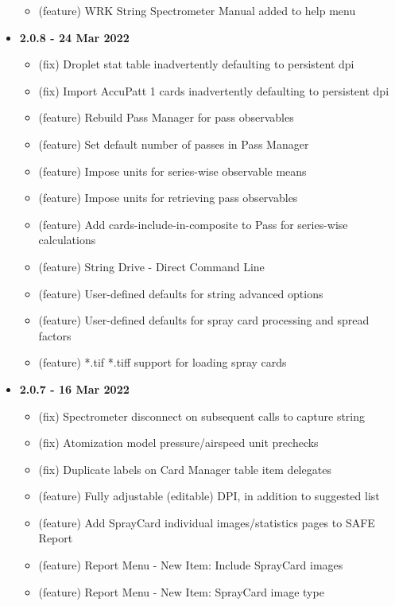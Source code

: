 \documentclass[10pt,letterpaper,titlepage]{article}
\begin{document}
\begin{itemize}
\begin{itemize}
            \item (feature) WRK String Spectrometer Manual added to help menu
        \end{itemize}
        \item \textbf{2.0.8 - 24 Mar 2022}
        \begin{itemize}
            \item (fix) Droplet stat table inadvertently defaulting to persistent dpi
            \item (fix) Import AccuPatt 1 cards inadvertently defaulting to persistent dpi
            \item (feature) Rebuild Pass Manager for pass observables
            \item (feature) Set default number of passes in Pass Manager
            \item (feature) Impose units for series-wise observable means
            \item (feature) Impose units for retrieving pass observables
            \item (feature) Add cards-include-in-composite to Pass for series-wise calculations
            \item (feature) String Drive - Direct Command Line
            \item (feature) User-defined defaults for string advanced options
            \item (feature) User-defined defaults for spray card processing and spread factors
            \item (feature) *.tif *.tiff support for loading spray cards
        \end{itemize}
        \item \textbf{2.0.7 - 16 Mar 2022}
        \begin{itemize}
            \item (fix) Spectrometer disconnect on subsequent calls to capture string
            \item (fix) Atomization model pressure/airspeed unit prechecks
            \item (fix) Duplicate labels on Card Manager table item delegates
            \item (feature) Fully adjustable (editable) DPI, in addition to suggested list
            \item (feature) Add SprayCard individual images/statistics pages to SAFE Report
            \item (feature) Report Menu - New Item: Include SprayCard images
            \item (feature) Report Menu - New Item: SprayCard image type

\end{itemize}
\end{itemize}
\end{document}
